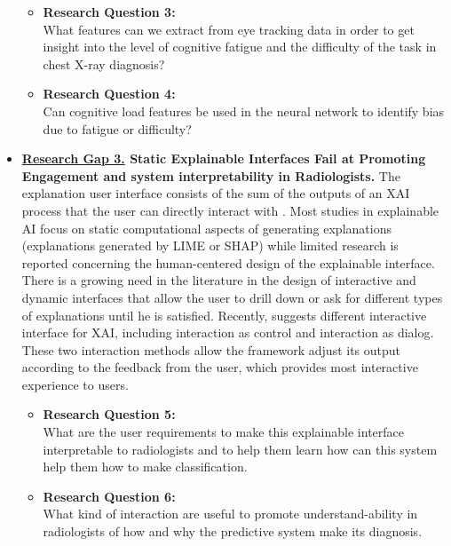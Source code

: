 \begin{itemize}
          \begin{itemize}
              \item \textbf{Research Question 3:} \\ What features can we extract from eye tracking data in order to get insight into the level of cognitive fatigue and the difficulty of the task in chest X-ray diagnosis?
              \item \textbf{Research Question 4:} \\ Can cognitive load features be used in the neural network to identify bias due to fatigue or difficulty?
          \end{itemize}
    \item \textbf{\underline{Research Gap 3.} Static Explainable Interfaces Fail at Promoting Engagement and system interpretability in Radiologists.} The explanation user interface consists of the sum of the outputs of an XAI process that the user can directly interact with \citep{Chromik2021}. Most studies in explainable AI focus on static computational aspects of generating explanations (explanations generated by LIME or SHAP) while limited research is reported concerning the human-centered design of the explainable interface. There is a growing need in the literature in the design of interactive and dynamic interfaces that allow the user to drill down or ask for different types of explanations until he is satisfied. Recently, \citet{Chromik2021} suggests different interactive interface for XAI, including interaction as control and interaction as dialog. These two interaction methods allow the framework adjust its output according to the feedback from the user, which provides most interactive experience to users.
          \begin{itemize}
              \item \textbf{Research Question 5:} \\ What are the user requirements to make this explainable interface interpretable to radiologists and to help them learn how can this system help them how to make classification.
              \item \textbf{Research Question 6:} \\ What kind of interaction are useful to promote understand-ability in radiologists of how and why the predictive system make its diagnosis.
          \end{itemize}
\end{itemize}





